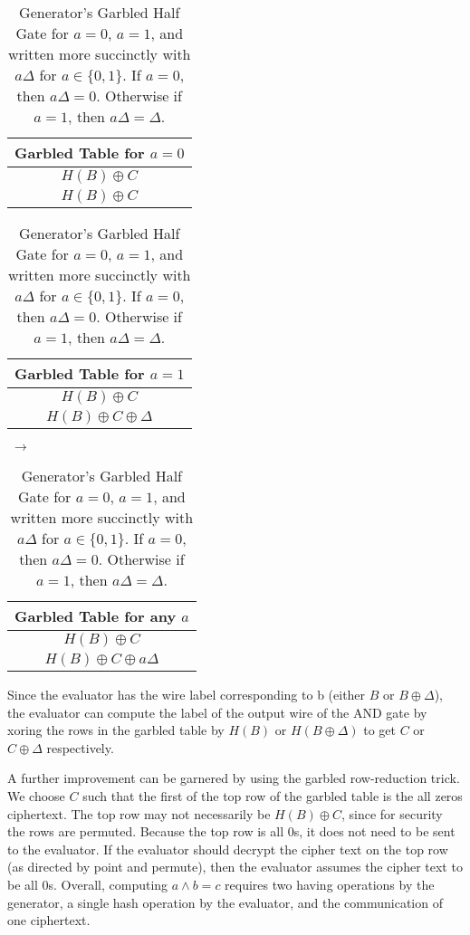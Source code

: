 \begin{table}[h]
    \label{tbl:halfgate-gg-garb}
    \centering
    \begin{tabular}{|c|}
        \hline
        Garbled Table for $a = 0$ \\
        \hline
        $H(B) \oplus C$ \\
        $H(B) \oplus C$ \\
        \hline
    \end{tabular}
    \begin{tabular}{|c|}
        \hline
        Garbled Table for $a = 1$ \\
        \hline
        $H(B) \oplus C$ \\
        $H(B) \oplus C \oplus \Delta$ \\
        \hline
    \end{tabular} $\;\rightarrow$
    \begin{tabular}{|c|}
        \hline
        Garbled Table for any $a$ \\
        \hline
        $H(B) \oplus C$ \\
        $H(B) \oplus C \oplus a\Delta$ \\
        \hline
    \end{tabular}
    \caption{Generator's Garbled Half Gate for $a = 0$, $a = 1$, and written more succinctly with $a\Delta$ for $a \in \{0,1\}$. If $a = 0$, then $a\Delta = 0$.  Otherwise if $a = 1$, then $a\Delta = \Delta$.}
\end{table}

Since the evaluator has the wire label corresponding to b (either $B$ or $B \oplus \Delta$), the evaluator can compute the label of the output wire of the AND gate by xoring the rows in the garbled table by $H(B)$ or $H(B \oplus \Delta)$ to get $C$ or $C \oplus \Delta$ respectively. 

A further improvement can be garnered by using the garbled row-reduction trick.
We choose $C$ such that the first of the top row of the garbled table is the all zeros ciphertext. 
The top row may not necessarily be $H(B) \oplus C$, since for security the rows are permuted. 
Because the top row is all 0s, it does not need to be sent to the evaluator. 
If the evaluator should decrypt the cipher text on the top row (as directed by point and permute), then the evaluator assumes the cipher text to be all 0s. Overall, computing $a \wedge b = c$ requires two having operations by the generator, a single hash operation by the evaluator, and the communication of one ciphertext. 

